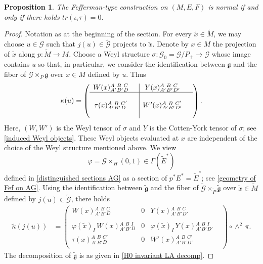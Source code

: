 \documentclass[11pt]{amsart}
\newtheorem{proposition}{Proposition}
\begin{document}
\begin{proposition}\label{AG Fef normality}
The Fefferman-type construction on $(M,E,F)$ is normal if and only if there holds $tr(\iota_\tau\tau)=0$.
\end{proposition}

\begin{proof}
Notation as at the beginning of the section. For every $\tilde x\in\tilde M$, we may choose $u\in\mathcal G$ such that $j(u)\in\tilde{\mathcal G}$ projects to $\tilde x$. Denote by $x\in M$ the projection of $\tilde x$ along $p:\tilde M\to M$. Choose a Weyl structure $\sigma:\mathcal G_0=\mathcal G/P_+\to\mathcal G$ whose image contains $u$ so that, in particular, we consider the identification between $\mathfrak g$ and the fiber of $\mathcal G\times_P\mathfrak g$ over $x\in M$ defined by $u$. Thus
\begin{align}
\kappa(u)=\left(\begin{array}{cc|cc}
W(x){}^A_{A'}{}^B_{B'}{}^{C}_{D}&&
Y(x){}^A_{A'}{}^B_{B'}{}^{C}_{D'}&\\
 \hline&&&\\
\tau(x){}^A_{A'}{}^B_{B'}{}^{C'}_{D}&&
W'(x){}^A_{A'}{}^B_{B'}{}^{C'}_{D'}&\\
 &&&
\end{array}\right).
\end{align}
Here, $(W,W')$ is the Weyl tensor of $\sigma$ and $Y$ is the Cotten-York tensor of $\sigma$; see \eqref{induced Weyl objects}. These Weyl objects evaluated at $x$ are independent of the choice of the Weyl structure mentioned above. We view
\[\varphi=\mathcal G\times_H(0,1)\in\Gamma(\tilde E^*)\]
defined in \cref{distinguished sections AG} as a section of $p^*E^*=\tilde E^*$; see \cref{geometry of Fef on AG}. Using the identification between $\tilde{\mathfrak g}$ and the fiber of $\tilde{\mathcal G}\times_{\tilde P}\tilde{\mathfrak g}$ over $\tilde x\in\tilde M$ defined by $j(u)\in\tilde{\mathcal G}$, there holds
\begin{align*}
\tilde\kappa(j(u))&=\left(\begin{array}{c|c|ccc}
	W(x){}^A_{A'}{}^B_{B'}{}^{C}_D&0&Y(x){}^A_{A'}{}^B_{B'}{}^{C}_{D'}&\\
 &&&\\
 \hline\varphi(\tilde x)_I\, W(x){}^A_{A'}{}^B_{B'}{}^{I}_D&0&\varphi(\tilde x)_I\, Y(x){}^A_{A'}{}^B_{B'}{}^{I}_{D'}&\\
\hline\tau(x){}^A_{A'}{}^B_{B'}{}^{C'}_{D}
    &0&W'(x){}^A_{A'}{}^B_{B'}{}^{C'}_{D'}&\\
 &&&
\end{array}\right)\circ\wedge^2\,\pi.
\end{align*}
The decomposition of $\tilde{\mathfrak g}$ is as given in \cref{H0 invariant LA decomp}.


\end{proof}
\end{document}

